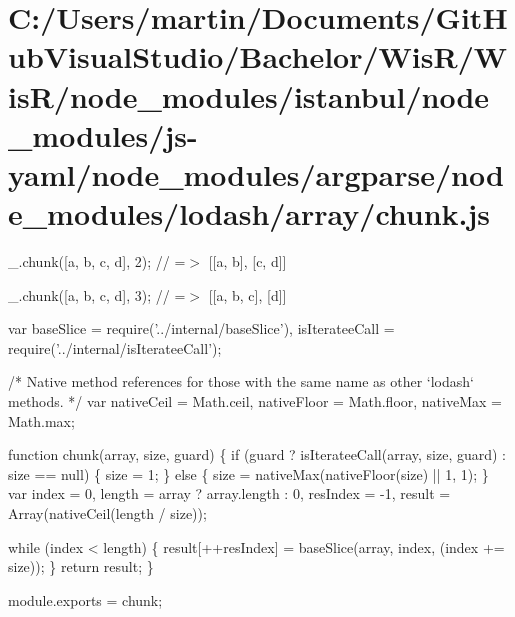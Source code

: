 \hypertarget{_c_1_2_users_2martin_2_documents_2_git_hub_visual_studio_2_bachelor_2_wis_r_2_wis_r_2node_module1dacf9b3929c42ed3a17c54220d9a4ba}{}\section{C\+:/\+Users/martin/\+Documents/\+Git\+Hub\+Visual\+Studio/\+Bachelor/\+Wis\+R/\+Wis\+R/node\+\_\+modules/istanbul/node\+\_\+modules/js-\/yaml/node\+\_\+modules/argparse/node\+\_\+modules/lodash/array/chunk.\+js}
\+\_\+.\+chunk(\mbox{[}\textquotesingle{}a\textquotesingle{}, \textquotesingle{}b\textquotesingle{}, \textquotesingle{}c\textquotesingle{}, \textquotesingle{}d\textquotesingle{}\mbox{]}, 2); // =$>$ \mbox{[}\mbox{[}\textquotesingle{}a\textquotesingle{}, \textquotesingle{}b\textquotesingle{}\mbox{]}, \mbox{[}\textquotesingle{}c\textquotesingle{}, \textquotesingle{}d\textquotesingle{}\mbox{]}\mbox{]}

\+\_\+.\+chunk(\mbox{[}\textquotesingle{}a\textquotesingle{}, \textquotesingle{}b\textquotesingle{}, \textquotesingle{}c\textquotesingle{}, \textquotesingle{}d\textquotesingle{}\mbox{]}, 3); // =$>$ \mbox{[}\mbox{[}\textquotesingle{}a\textquotesingle{}, \textquotesingle{}b\textquotesingle{}, \textquotesingle{}c\textquotesingle{}\mbox{]}, \mbox{[}\textquotesingle{}d\textquotesingle{}\mbox{]}\mbox{]}


\begin{DoxyCodeInclude}
var baseSlice = require(\textcolor{stringliteral}{'../internal/baseSlice'}),
    isIterateeCall = require(\textcolor{stringliteral}{'../internal/isIterateeCall'});

\textcolor{comment}{/* Native method references for those with the same name as other `lodash` methods. */}
var nativeCeil = Math.ceil,
    nativeFloor = Math.floor,
    nativeMax = Math.max;

\textcolor{keyword}{function} chunk(array, size, guard) \{
  \textcolor{keywordflow}{if} (guard ? isIterateeCall(array, size, guard) : size == null) \{
    size = 1;
  \} \textcolor{keywordflow}{else} \{
    size = nativeMax(nativeFloor(size) || 1, 1);
  \}
  var index = 0,
      length = array ? array.length : 0,
      resIndex = -1,
      result = Array(nativeCeil(length / size));

  \textcolor{keywordflow}{while} (index < length) \{
    result[++resIndex] = baseSlice(array, index, (index += size));
  \}
  \textcolor{keywordflow}{return} result;
\}

module.exports = chunk;
\end{DoxyCodeInclude}
 